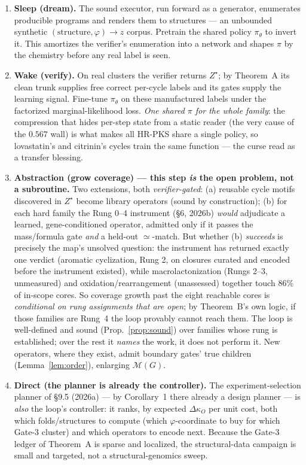 \documentclass[11pt]{article}
\theoremstyle{plain}
\theoremstyle{definition}
\newcommand{\Zstar}{Z^{\star}}
\newcommand{\kO}{\kappa_{O}}
\newcommand{\Mset}{\mathcal{M}}
\begin{document}
\begin{enumerate}[leftmargin=1.6em,itemsep=1pt]
\item \textbf{Sleep (dream).} The sound executor, run forward as a generator, enumerates producible programs and renders them to structures --- an unbounded synthetic $(\text{structure},\varphi)\!\to\!z$ corpus. Pretrain the shared policy $\pi_\theta$ to invert it. This amortizes the verifier's enumeration into a network and shapes $\pi$ by the chemistry before any real label is seen.
\item \textbf{Wake (verify).} On real clusters the verifier returns $\Zstar$; by Theorem~A its clean trunk supplies free correct per-cycle labels and its gates supply the learning signal. Fine-tune $\pi_\theta$ on these manufactured labels under the factorized marginal-likelihood loss. \emph{One shared $\pi$ for the whole family}: the compression that hides per-step state from a static reader (the very cause of the $0.567$ wall) is what makes all HR-PKS share a single policy, so lovastatin's and citrinin's cycles train the same function --- the curse read as a transfer blessing.
\item \textbf{Abstraction (grow coverage) --- this step \emph{is} the open problem, not a subroutine.} Two extensions, both \emph{verifier-gated}: (a) reusable cycle motifs discovered in $\Zstar$ become library operators (sound by construction); (b) for each hard family the Rung 0--4 instrument (\S6, 2026b) \emph{would} adjudicate a learned, gene-conditioned operator, admitted only if it passes the mass/formula gate \emph{and} a held-out $\simeq$-match. But whether (b) \emph{succeeds} is precisely the map's unsolved question: the instrument has returned exactly one verdict (aromatic cyclization, Rung 2, on closures curated and encoded before the instrument existed), while macrolactonization (Rungs 2--3, unmeasured) and oxidation/rearrangement (unassessed) together touch $86\%$ of in-scope cores. So coverage growth past the eight reachable cores is \emph{conditional on rung assignments that are open}; by Theorem~B's own logic, if those families are Rung~4 the loop provably cannot reach them. The loop is well-defined and sound (Prop.~\ref{prop:sound}) over families whose rung is established; over the rest it \emph{names} the work, it does not perform it. New operators, where they exist, admit boundary gates' true children (Lemma~\ref{lem:order}), enlarging $\Mset(G)$.
\item \textbf{Direct (the planner is already the controller).} The experiment-selection planner of \S9.5 (2026a) --- by Corollary~1 there already a design planner --- is \emph{also} the loop's controller: it ranks, by expected $\Delta\kO$ per unit cost, both which folds/structures to compute (which $\varphi$-coordinate to buy for which Gate-3 cluster) and which operators to encode next. Because the Gate-3 ledger of Theorem~A is sparse and localized, the structural-data campaign is small and targeted, not a structural-genomics sweep.
\end{enumerate}
\end{document}
